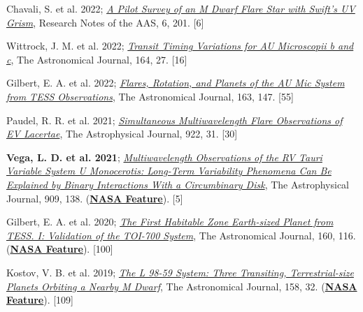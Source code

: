 \documentclass[letter,12pt]{article}
\begin{document}
\begin{etaremune}
\item {Chavali, S. et al. 2022}; \href{https://ui.adsabs.harvard.edu/abs/2022RNAAS...6..201C/abstract}{\it A Pilot Survey of an M Dwarf Flare Star with Swift’s UV Grism}, Research Notes of the AAS, 6, 201. [6]

\item {Wittrock, J. M. et al. 2022}; \href{https://ui.adsabs.harvard.edu/abs/2022AJ....164...27W/abstract}{\it Transit Timing Variations for AU Microscopii b and c}, The Astronomical Journal, 164, 27. [16]

\item Gilbert, E. A. et al. 2022; \href{https://ui.adsabs.harvard.edu/abs/2022AJ....163..147G/abstract}{\it Flares, Rotation, and Planets of the AU Mic System from TESS Observations}, The Astronomical Journal, 163, 147. [55]

\item {Paudel, R. R. et al. 2021}; 
\href{https://ui.adsabs.harvard.edu/abs/2021ApJ...922...31P/abstract}{\it Simultaneous Multiwavelength Flare Observations of EV Lacertae}, The Astrophysical Journal, 922, 31. [30]

\item {\bf Vega, L. D. et al. 2021}; \href{https://ui.adsabs.harvard.edu/abs/2021ApJ...909..138V/abstract}{\it Multiwavelength Observations of the RV Tauri Variable System U Monocerotis: Long-Term Variability Phenomena Can Be Explained by Binary Interactions With a Circumbinary Disk}, The Astrophysical Journal, 909, 138. (\href{https://www.nasa.gov/feature/goddard/2021/scientists-sketch-aged-star-system-using-over-a-century-of-observations/}{\bf NASA Feature}). [5]

\item Gilbert, E. A. et al. 2020; \href{https://ui.adsabs.harvard.edu/abs/2020AJ....160..116G/abstract}{\it The First Habitable Zone Earth-sized Planet from TESS. I: Validation of the TOI-700 System}, The Astronomical Journal, 160, 116.
(\href{https://www.nasa.gov/feature/goddard/2020/nasa-planet-hunter-finds-its-1st-earth-size-habitable-zone-world}{\bf NASA Feature}). [100]

\item Kostov, V. B. et al. 2019; \href{https://ui.adsabs.harvard.edu/abs/2019AJ....158...32K/abstract}{{\it The L 98-59 System: Three Transiting, Terrestrial-size Planets Orbiting a Nearby M Dwarf}}, The Astronomical Journal, 158, 32.
(\href{https://www.nasa.gov/feature/goddard/2019/nasa-s-tess-mission-finds-its-smallest-planet-yet}{\bf NASA Feature}). [109]


\end{etaremune}
\end{document}

